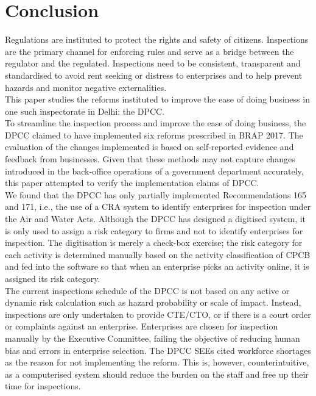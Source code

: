 \documentclass[a4paper, 12pt]{article}
\begin{document}
	\section{Conclusion}
	
	Regulations are instituted to protect the rights and safety of citizens. Inspections are the primary channel for enforcing rules and serve as a bridge between the regulator and the regulated. Inspections need to be consistent, transparent and standardised to avoid rent seeking or distress to enterprises and to help prevent hazards and monitor negative externalities. \\
	
	This paper studies the reforms instituted to improve the ease of doing business in one such inspectorate in Delhi: the DPCC. \\
	
	To streamline the inspection process and improve the ease of doing business, the DPCC claimed to have implemented six reforms prescribed in BRAP 2017. The evaluation of the changes implemented is based on self-reported evidence and feedback from businesses. Given that these methods may not capture changes introduced in the back-office operations of a government department accurately, this paper attempted to verify the implementation claims of DPCC. \\
	
	We found that the DPCC has only partially implemented Recommendations 165 and 171, i.e., the use of a CRA system to identify enterprises for inspection under the Air and Water Acts. Although the DPCC has designed a digitised system, it is only used to assign a risk category to firms and not to identify enterprises for inspection. The digitisation is merely a check-box exercise; the risk category for each activity is determined manually based on the activity classification of CPCB and fed into the software so that when an enterprise picks an activity online, it is assigned its risk category. \\
	
	The current inspections schedule of the DPCC is not based on any active or dynamic risk calculation such as hazard probability or scale of impact. Instead, inspections are only undertaken to provide CTE/CTO, or if there is a court order or complaints against an enterprise. Enterprises are chosen for inspection manually by the Executive Committee, failing the objective of reducing human bias and errors in enterprise selection. The DPCC SEEs cited workforce shortages as the reason for not implementing the reform. This is, however, counterintuitive, as a computerised system should reduce the burden on the staff and free up their time for inspections. \\
	
\end{document}
